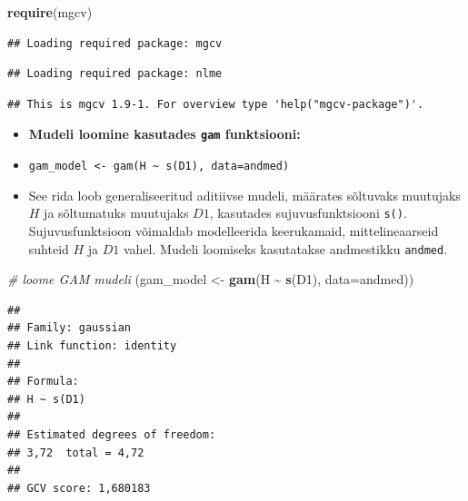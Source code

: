 \documentclass[
]{book}
\newenvironment{Shaded}{\begin{snugshade}}{\end{snugshade}}
\newcommand{\AttributeTok}[1]{\textcolor[rgb]{0.13,0.29,0.53}{#1}}
\newcommand{\CommentTok}[1]{\textcolor[rgb]{0.56,0.35,0.01}{\textit{#1}}}
\newcommand{\FunctionTok}[1]{\textcolor[rgb]{0.13,0.29,0.53}{\textbf{#1}}}
\newcommand{\NormalTok}[1]{#1}
\newcommand{\OtherTok}[1]{\textcolor[rgb]{0.56,0.35,0.01}{#1}}
\newcommand{\SpecialCharTok}[1]{\textcolor[rgb]{0.81,0.36,0.00}{\textbf{#1}}}
\providecommand{\tightlist}{%
  \setlength{\itemsep}{0pt}\setlength{\parskip}{0pt}}
\renewenvironment{Shaded} {\begin{snugshade}\footnotesize} {\end{snugshade}}
\begin{document}
\begin{Shaded}
\begin{Highlighting}[]
\FunctionTok{require}\NormalTok{(mgcv)}
\end{Highlighting}
\end{Shaded}

\begin{verbatim}
## Loading required package: mgcv
\end{verbatim}

\begin{verbatim}
## Loading required package: nlme
\end{verbatim}

\begin{verbatim}
## This is mgcv 1.9-1. For overview type 'help("mgcv-package")'.
\end{verbatim}

\begin{itemize}
\tightlist
\item
  \textbf{Mudeli loomine kasutades \texttt{gam} funktsiooni:}
\item
  \texttt{gam\_model\ \textless{}-\ gam(H\ \textasciitilde{}\ s(D1),\ data=andmed)}
\item
  See rida loob generaliseeritud aditiivse mudeli, määrates sõltuvaks muutujaks \(H\) ja sõltumatuks muutujaks \(D1\), kasutades sujuvusfunktsiooni \texttt{s()}. Sujuvusfunktsioon võimaldab modelleerida keerukamaid, mittelineaarseid suhteid \(H\) ja \(D1\) vahel. Mudeli loomiseks kasutatakse andmestikku \texttt{andmed}.
\end{itemize}

\begin{Shaded}
\begin{Highlighting}[]
\CommentTok{\# loome GAM mudeli}
\NormalTok{(gam\_model }\OtherTok{\textless{}{-}} \FunctionTok{gam}\NormalTok{(H }\SpecialCharTok{\textasciitilde{}} \FunctionTok{s}\NormalTok{(D1), }\AttributeTok{data=}\NormalTok{andmed))}
\end{Highlighting}
\end{Shaded}

\begin{verbatim}
## 
## Family: gaussian 
## Link function: identity 
## 
## Formula:
## H ~ s(D1)
## 
## Estimated degrees of freedom:
## 3,72  total = 4,72 
## 
## GCV score: 1,680183
\end{verbatim}
\end{document}
